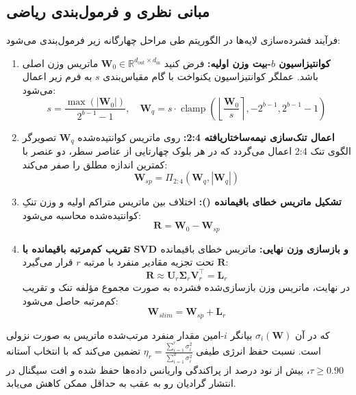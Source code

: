 \subsection{مبانی نظری و فرمول‌بندی ریاضی}
فرآیند فشرده‌سازی لایه‌ها در الگوریتم  طی مراحل چهارگانه زیر فرمول‌بندی می‌شود:
\begin{enumerate}
    \item \textbf{کوانتیزاسیون $b$-بیت وزن اولیه:}
    فرض کنید $\mathbf{W}_0 \in \mathbb{R}^{d_{\text{out}} \times d_{\text{in}}}$ ماتریس وزن اصلی باشد. عملگر کوانتیزاسیون یکنواخت با گام مقیاس‌بندی $s$ به فرم زیر اعمال می‌شود:
    \begin{equation}
    s = \frac{\max(|\mathbf{W}_0|)}{2^{b-1} - 1}, \quad \mathbf{W}_q = s \cdot \operatorname{clamp}\left( \left\lfloor \frac{\mathbf{W}_0}{s} \right\rceil, -2^{b-1}, 2^{b-1} - 1 \right)
    \end{equation}
    \item \textbf{اعمال تنک‌سازی نیمه‌ساختاریافته 2:4:}
    روی ماتریس کوانتیده‌شده $\mathbf{W}_q$ تصویرگر الگوی تنک 2:4 اعمال می‌گردد که در هر بلوک چهارتایی از عناصر سطر، دو عنصر با کمترین اندازه مطلق را صفر می‌کند:
    \begin{equation}
    \mathbf{W}_{sp} = \Pi_{2:4}(\mathbf{W}_q, |\mathbf{W}_q|)
    \end{equation}
    \item \textbf{تشکیل ماتریس خطای باقیمانده ():}
    اختلاف بین ماتریس متراکم اولیه و وزن تنکِ کوانتیده‌شده محاسبه می‌شود:
    \begin{equation}
    \mathbf{R} = \mathbf{W}_0 - \mathbf{W}_{sp}
    \end{equation}
    \item \textbf{تقریب کم‌مرتبه باقیمانده با SVD و بازسازی وزن نهایی:}
    ماتریس خطای باقیمانده $\mathbf{R}$ تحت تجزیه مقادیر منفرد با مرتبه $r$ قرار می‌گیرد:
    \begin{equation}
    \mathbf{R} \approx \mathbf{U}_r \boldsymbol{\Sigma}_r \mathbf{V}_r^\top = \mathbf{L}_r
    \end{equation}
    در نهایت، ماتریس وزن بازسازی‌شده فشرده به صورت مجموع مؤلفه تنک و تقریب کم‌مرتبه حاصل می‌شود:
    \begin{equation}
    \mathbf{W}_{slim} = \mathbf{W}_{sp} + \mathbf{L}_r
    \end{equation}
\end{enumerate}

که در آن $\sigma_i(\mathbf{W})$ بیانگر $i$-امین مقدار منفرد مرتب‌شده ماتریس به صورت نزولی است. نسبت حفظ انرژی طیفی $\eta_r = \frac{\sum_{i=1}^r \sigma_i^2}{\sum_{i=1}^{d} \sigma_i^2}$ تضمین می‌کند که با انتخاب آستانه $\tau \ge 0.90$، بیش از نود درصد از پراکندگی واریانس داده‌ها حفظ شده و افت سیگنال در انتشار گرادیان رو به عقب به حداقل ممکن کاهش می‌یابد.

